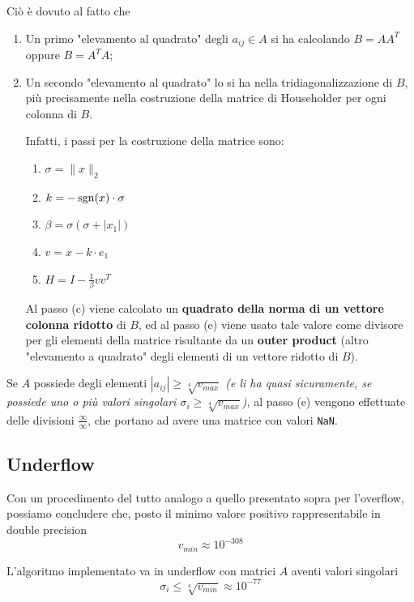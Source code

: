 Ciò è dovuto al fatto che
\begin{enumerate}
	\item Un primo "elevamento al quadrato" degli $a_{ij} \in A$ si ha calcolando 
$B = A A^T$ oppure $B = A^T A$;
	\item Un secondo "elevamento al quadrato" lo si ha nella tridiagonalizzazione 
di $B$, più precisamente nella costruzione della matrice di Householder per ogni 
colonna di $B$.
	
	Infatti, i passi per la costruzione della matrice sono:
	\begin{enumerate}
		\item $\sigma = \| x \|_2$
		\item $k = -\operatorname{sgn}(x) \cdot \sigma$
		\item $\beta = \sigma (\sigma + | x_1 |)$
		\item $v = x - k \cdot e_1$
		\item $H = I - \frac{1}{\beta}v v^T $
	\end{enumerate}
	
Al passo (c) viene calcolato un \textbf{quadrato della norma di un vettore 
colonna ridotto} di $B$, ed al passo (e) viene usato tale valore come divisore 
per gli elementi della matrice risultante da un \textbf{outer product} (altro 
"elevamento a quadrato" degli elementi di un vettore ridotto di $B$).


\end{enumerate}

Se $A$ possiede degli elementi $|a_{ij}| \geq \sqrt[4]{v_{max}}$ \textit{(e li 
ha quasi sicuramente, se possiede uno o più valori singolari $\sigma_i \geq 
\sqrt[4]{v_{max}}$)}, al passo (e) vengono effettuate delle divisioni 
$\frac{\infty}{\infty}$, che portano ad avere una matrice con valori 
\texttt{NaN}.



\subsection{Underflow}
Con un procedimento del tutto analogo a quello presentato sopra per l'overflow, 
possiamo concludere che, posto il minimo valore positivo rappresentabile in 
double 
precision
\begin{equation*}
	v_{min} \approx 10^{-308}
\end{equation*}

L'algoritmo implementato va in underflow con matrici $A$ aventi valori singolari
\begin{equation*}
	\sigma_i \leq \sqrt[4]{v_{min}} \approx 10^{-77}
\end{equation*}

